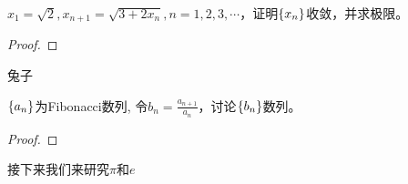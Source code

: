 \begin{proposition}
    $ x_1 = \sqrt{2}, x_{n+1} = \sqrt{3+2x_n}, n = 1, 2, 3, \cdots $，证明$\left\{ x_n\right\}$收敛，并求极限。
\end{proposition}
\begin{proof}

\end{proof}

兔子
\begin{proposition}[Fibonacci数列]
    $\left\{ a_n\right\}$为Fibonacci数列, 令$b_n = \frac{a_{n+1}}{a_n}$，讨论$\left\{ b_n\right\}$数列。
    
\end{proposition}
\begin{proof}

\end{proof}

接下来我们来研究$\pi$和$e$

